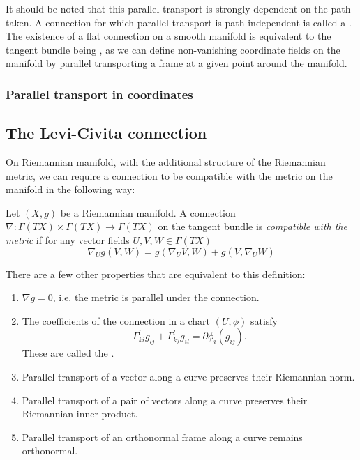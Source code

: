It should be noted that this parallel transport is strongly dependent on the path taken.
A connection for which parallel transport is path independent is called a .
The existence of a flat connection on a smooth manifold is equivalent to the tangent bundle being , as we can define non-vanishing coordinate fields on the manifold by parallel transporting a frame at a given point around the manifold.

\subsubsection{Parallel transport in coordinates}



\subsection{The Levi-Civita connection}
On Riemannian manifold, with the additional structure of the Riemannian metric, we can require a connection to be compatible with the metric on the manifold in the following way:
\begin{definition}
	\label{def:metric_compatible_connection}
	Let \((X, g)\) be a Riemannian manifold.
	A connection \(\nabla: \Gamma(TX) \times \Gamma(TX) \to \Gamma(TX)\) on the tangent bundle is \emph{compatible with the metric} if for any vector fields \(U, V, W\in \Gamma(TX)\)
	\[
		\nabla_U g(V, W) = g(\nabla_U V, W) + g(V, \nabla_U W)	
	\]
\end{definition}
There are a few other properties that are equivalent to this definition:
\begin{enumerate}
	\item \(\nabla g = 0\), i.e. the metric is parallel under the connection.
	\item The coefficients of the connection in a chart \((U, \phi)\) satisfy
	\[\Gamma_{ki}^l g_{lj} + \Gamma_{kj}^lg_{il} = \partial\phi_i(g_{ij}) .\] These are called the .
	\item Parallel transport of a vector along a curve preserves their Riemannian norm.
	\item Parallel transport of a pair of vectors along a curve preserves their Riemannian inner product.
	\item Parallel transport of an orthonormal frame along a curve remains orthonormal.
\end{enumerate}
